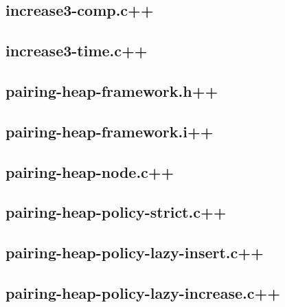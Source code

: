 \documentclass{DIKU-article}[2010/01/13]
\begin{document}
\subsection{increase3-comp.c++}


\subsection{increase3-time.c++}


\subsection{pairing-heap-framework.h++}


\subsection{pairing-heap-framework.i++}


\subsection{pairing-heap-node.c++}


\subsection{pairing-heap-policy-strict.c++}


\subsection{pairing-heap-policy-lazy-insert.c++}


\subsection{pairing-heap-policy-lazy-increase.c++}

\end{document}
